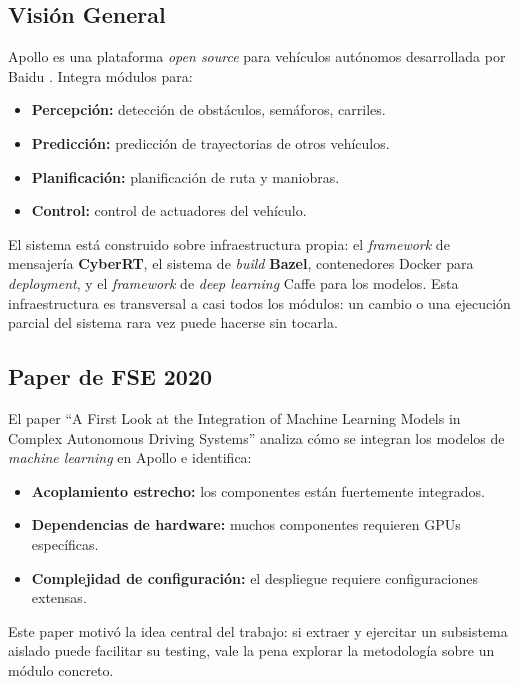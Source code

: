 \subsection{Visión General}

Apollo es una plataforma \textit{open source} para vehículos autónomos desarrollada por Baidu \cite{apollo_auto}. Integra módulos para:

\begin{itemize}
    \item \textbf{Percepción:} detección de obstáculos, semáforos, carriles.
    \item \textbf{Predicción:} predicción de trayectorias de otros vehículos.
    \item \textbf{Planificación:} planificación de ruta y maniobras.
    \item \textbf{Control:} control de actuadores del vehículo.
\end{itemize}

El sistema está construido sobre infraestructura propia: el \textit{framework} de mensajería \textbf{CyberRT}, el sistema de \textit{build} \textbf{Bazel}, contenedores Docker para \textit{deployment}, y el \textit{framework} de \textit{deep learning} Caffe para los modelos. Esta infraestructura es transversal a casi todos los módulos: un cambio o una ejecución parcial del sistema rara vez puede hacerse sin tocarla.

\subsection{Paper de FSE 2020}

El paper ``A First Look at the Integration of Machine Learning Models in Complex Autonomous Driving Systems'' \cite{peng2020first} analiza cómo se integran los modelos de \textit{machine learning} en Apollo e identifica:

\begin{itemize}
    \item \textbf{Acoplamiento estrecho:} los componentes están fuertemente integrados.
    \item \textbf{Dependencias de hardware:} muchos componentes requieren GPUs específicas.
    \item \textbf{Complejidad de configuración:} el despliegue requiere configuraciones extensas.
\end{itemize}

Este paper motivó la idea central del trabajo: si extraer y ejercitar un subsistema aislado puede facilitar su testing, vale la pena explorar la metodología sobre un módulo concreto.

